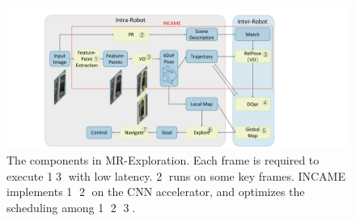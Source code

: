 \begin{figure}[t]
    \centering
	\includegraphics[width=0.99\linewidth]{fig/maexp.pdf}
     \caption{
        The components in MR-Exploration.  Each frame is required to execute \textcircled{1}\textcircled{3} with low latency. \textcircled{2} runs on some key frames. INCAME implements \textcircled{1} \textcircled{2} on the CNN accelerator, and optimizes the scheduling among \textcircled{1} \textcircled{2}  \textcircled{3}.
    }
	\label{fig:maexp}
\end{figure}






